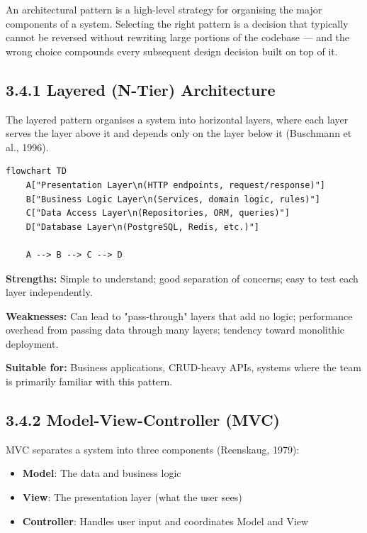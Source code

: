 \documentclass[11pt,a4paper]{book}
\begin{document}
An architectural pattern is a high-level strategy for organising the major components of a system. Selecting the right pattern is a decision that typically cannot be reversed without rewriting large portions of the codebase --- and the wrong choice compounds every subsequent design decision built on top of it.

\subsection{3.4.1 Layered (N-Tier) Architecture}

The layered pattern organises a system into horizontal layers, where each layer serves the layer above it and depends only on the layer below it (Buschmann et al., 1996).

\begin{lstlisting}
flowchart TD
    A["Presentation Layer\n(HTTP endpoints, request/response)"]
    B["Business Logic Layer\n(Services, domain logic, rules)"]
    C["Data Access Layer\n(Repositories, ORM, queries)"]
    D["Database Layer\n(PostgreSQL, Redis, etc.)"]

    A --> B --> C --> D
\end{lstlisting}

\textbf{Strengths:} Simple to understand; good separation of concerns; easy to test each layer independently.

\textbf{Weaknesses:} Can lead to "pass-through" layers that add no logic; performance overhead from passing data through many layers; tendency toward monolithic deployment.

\textbf{Suitable for:} Business applications, CRUD-heavy APIs, systems where the team is primarily familiar with this pattern.

\subsection{3.4.2 Model-View-Controller (MVC)}

MVC separates a system into three components (Reenskaug, 1979):

\begin{itemize}
  \item \textbf{Model}: The data and business logic
  \item \textbf{View}: The presentation layer (what the user sees)
  \item \textbf{Controller}: Handles user input and coordinates Model and View
\end{itemize}
\end{document}
